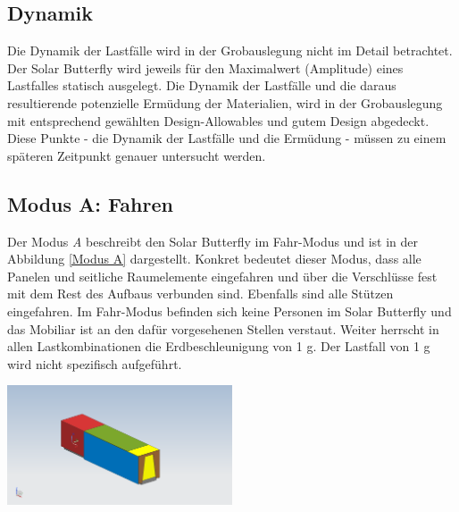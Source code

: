 \subsection{Dynamik}
Die Dynamik der Lastfälle wird in der Grobauslegung nicht im Detail betrachtet. Der Solar Butterfly wird jeweils für den Maximalwert (Amplitude) eines Lastfalles statisch ausgelegt. Die Dynamik der Lastfälle und die daraus resultierende potenzielle Ermüdung der Materialien, wird in der Grobauslegung mit entsprechend gewählten Design-Allowables und gutem Design abgedeckt.\\
Diese Punkte - die Dynamik der Lastfälle und die Ermüdung - müssen zu einem späteren Zeitpunkt genauer untersucht werden.

\subsection{Modus A: Fahren}
Der Modus \emph{A} beschreibt den Solar Butterfly im \glqq Fahr-Modus\grqq{} und ist in der Abbildung \ref{Modus A} dargestellt. Konkret bedeutet dieser Modus, dass alle Panelen und seitliche Raumelemente eingefahren und über die Verschlüsse fest mit dem Rest des Aufbaus verbunden sind. Ebenfalls sind alle Stützen eingefahren. Im Fahr-Modus befinden sich keine Personen im Solar Butterfly und das Mobiliar ist an den dafür vorgesehenen Stellen verstaut. Weiter herrscht in allen Lastkombinationen die Erdbeschleunigung von 1 g. Der Lastfall von 1 g wird nicht spezifisch aufgeführt.

\begin{center}
  \includegraphics[width=0.5\textwidth]{04_Figures/A.png}
  \label{Modus A}
\end{center}

